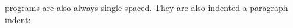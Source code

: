 \lamC programs are also always single-spaced. They are also indented a paragraph indent:

\begin{singlespace}\begin{hscode}\linenumsetup\printlinebegin\SaveRestoreHook
{}%
%
%
%
\>[3]{}\;\mathrel{=}\<[E]%
\printlineend\\
\printlinebegin\>[3]{}\<[5]%
\>[5]{}\leftarrow {}\<[E]%
\printlineend\\
\printlinebegin\>[3]{}\<[5]%
\>[5]{}\;\<[E]%
\printlineend\ColumnHook
\end{hscode}\resethooks
\end{singlespace}


